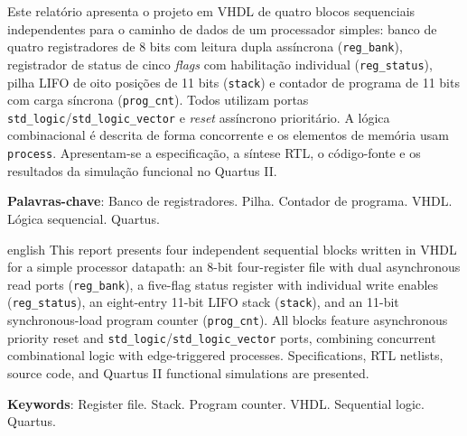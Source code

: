 \documentclass[
	12pt,				%
	oneside,			%
	a4paper,			%
	sumario = tradicional,
	english,			%
	brazilian			%
	]{abntex2}
\begin{document}
\frenchspacing 

\pretextual
\imprimircapa 
\imprimirfolhaderosto

\begin{resumo}
Este relatório apresenta o projeto em VHDL de quatro blocos sequenciais independentes para o caminho de dados de um processador simples: banco de quatro registradores de 8 bits com leitura dupla assíncrona (\texttt{reg\_bank}), registrador de status de cinco \textit{flags} com habilitação individual (\texttt{reg\_status}), pilha LIFO de oito posições de 11 bits (\texttt{stack}) e contador de programa de 11 bits com carga síncrona (\texttt{prog\_cnt}). Todos utilizam portas \texttt{std\_logic}/\texttt{std\_logic\_vector} e \textit{reset} assíncrono prioritário. A lógica combinacional é descrita de forma concorrente e os elementos de memória usam \texttt{process}. Apresentam-se a especificação, a síntese RTL, o código-fonte e os resultados da simulação funcional no Quartus II.

\textbf{Palavras-chave}: Banco de registradores. Pilha. Contador de programa. VHDL. Lógica sequencial. Quartus.
\end{resumo}

\begin{resumo}[Abstract]
\begin{otherlanguage*}{english}
This report presents four independent sequential blocks written in VHDL for a simple processor datapath: an 8-bit four-register file with dual asynchronous read ports (\texttt{reg\_bank}), a five-flag status register with individual write enables (\texttt{reg\_status}), an eight-entry 11-bit LIFO stack (\texttt{stack}), and an 11-bit synchronous-load program counter (\texttt{prog\_cnt}). All blocks feature asynchronous priority reset and \texttt{std\_logic}/\texttt{std\_logic\_vector} ports, combining concurrent combinational logic with edge-triggered processes. Specifications, RTL netlists, source code, and Quartus II functional simulations are presented.

\vspace{\onelineskip}
\noindent\textbf{Keywords}: Register file. Stack. Program counter. VHDL. Sequential logic. Quartus.
\end{otherlanguage*}
\end{resumo}
\end{document}
